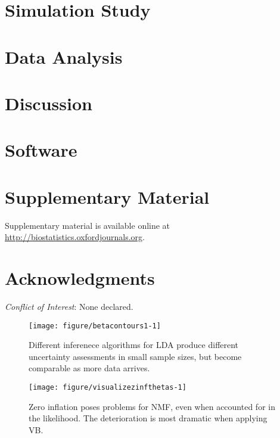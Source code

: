 \documentclass[oupdraft]{bio}
\begin{document}
\section{Simulation Study}
\section{Data Analysis}

\section{Discussion}

\section{Software}

\section{Supplementary Material}

Supplementary material is available online at
\url{http://biostatistics.oxfordjournals.org}.

\section*{Acknowledgments}

{\it Conflict of Interest}: None declared.




\begin{figure}
  \centering
  \texttt{[image: figure/betacontours1-1]}
  \caption{Different inferenece algorithms for LDA produce different uncertainty
    assessments in small sample sizes, but become comparable as more data arrives.}
  \label{fig:lda_contours}
\end{figure}

\begin{figure}
  \centering
  \texttt{[image: figure/visualizezinfthetas-1]}
  \caption{Zero inflation poses problems for NMF, even when accounted for in the likelihood. The deterioration is most dramatic when applying VB.}
\end{figure}
\end{document}
